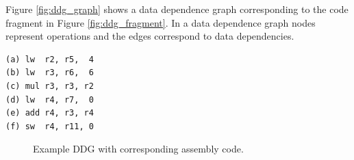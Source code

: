 Figure \ref{fig:ddg_graph} shows a data dependence graph corresponding to the code fragment in Figure \ref{fig:ddg_fragment}. In a data dependence graph nodes represent operations and the edges correspond to data dependencies.

\newsavebox{\ddgfragmentlst}
\begin{lrbox}{\ddgfragmentlst}
  \begin{lstlisting}
(a) lw  r2, r5,  4
(b) lw  r3, r6,  6
(c) mul r3, r3, r2
(d) lw  r4, r7,  0
(e) add r4, r3, r4
(f) sw  r4, r11, 0
  \end{lstlisting}
\end{lrbox}

\begin{figure}[H]
  \centering
   \quad\quad%
  \caption{Example DDG with corresponding assembly code.}
  \label{fig:ddg}
\end{figure}


